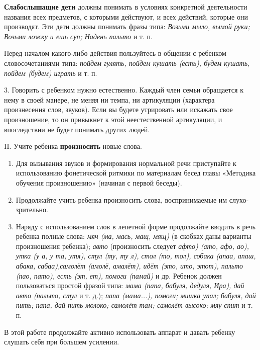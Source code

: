 \documentclass[a5paper]{book}
\renewcommand{\emph}[1]{\textit{#1}}
\begin{document}
\textbf{Слабослышащие дети} должны понимать в условиях конкретной
деятельности названия всех предметов, с которыми действуют, и всех
действий, которые они производят. Эти дети должны понимать фразы типа:
\emph{Возьми мыло, вымой руки; Возьми ложку и ешь суп; Надень пальто} и
т. п.

Перед началом какого-либо действия пользуйтесь в общении с ребенком
словосочетаниями типа: \emph{пойдем гулять, пойдем кушать (есть), будем
кушать, пойдем (будем) играть} и т. п.

3. Говорить с ребенком нужно естественно. Каждый член семьи обращается к
нему в своей манере, не меняя ни темпа, ни артикуляции (характера
произнесения слов, звуков). Если вы будете утрировать или искажать свое
произношение, то он привыкнет к этой неестественной артикуляции, и
впоследствии не будет понимать других людей.

II. Учите ребенка \textbf{произносить} новые слова.


\begin{enumerate}
\def\labelenumi{\arabic{enumi}.}
\item
  
  Для вызывания звуков и формирования нормальной речи приступайте к
  использованию фонетической ритмики по материалам бесед главы «Методика
  обучения произношению» (начиная с первой беседы).
  
\item
  
  Продолжайте учить ребенка произносить слова, воспринимаемые им
  слухо-зрительно.
  
\item
  
  Наряду с использованием слов в лепетной форме продолжайте вводить в
  речь ребенка полные слова: \emph{мяч (ма, мась, мащ, мящ)} (в скобках
  даны варианты произношения ребенка); \emph{авто} (произносить следует
  \emph{афто) (ато, афо, ао), утка (у а, у та, утя), стул (ту, ту л),
  стол (то, тол), собака (апаа, апаш, абака, сабаа),самолёт (амолё,
  амалёт), идёт (это, ито, этот), пальто (пао, пато), есть (эт, ет),
  помоги (памай)} и др. Ребенок должен пользоваться простой фразой типа:
  \emph{мама (папа, бабуля, дедуля, Ира), дай авто (пальто, стул} и т.
  д.); \emph{папа (мама...), помоги; мишка упал; бабуля, дай пить; папа,
  дай пить молоко; самолёт там; самолёт высоко; мяу спит} и т. п.
  
\end{enumerate}


В этой работе продолжайте активно использовать аппарат и давать ребенку
слушать себя при большем усилении.
\end{document}
